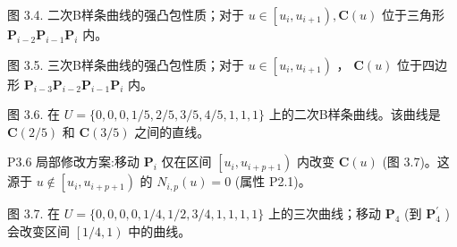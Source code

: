 \documentclass[../main.tex]{subfiles}
\begin{document}
\begin{center}
\begin{minipage}{16cm}
\vspace*{.6\baselineskip}
\centering
{}
\par\smallskip
图 3.4. 二次B样条曲线的强凸包性质；对于 \(u \in  \left\lbrack  {{u}_{i},{u}_{i + 1}}\right) ,\mathbf{C}\left( u\right)\) 位于三角形 \({\mathbf{P}}_{i - 2}{\mathbf{P}}_{i - 1}{\mathbf{P}}_{i}\) 内。
\end{minipage}
\end{center}

\begin{center}
\begin{minipage}{16cm}
\vspace*{.6\baselineskip}
\centering
{}
\par\smallskip
图 3.5. 三次B样条曲线的强凸包性质；对于 \(u \in  \left\lbrack  {{u}_{i},{u}_{i + 1}}\right)\) ， \(\mathbf{C}\left( u\right)\) 位于四边形 \({\mathbf{P}}_{i - 3}{\mathbf{P}}_{i - 2}{\mathbf{P}}_{i - 1}{\mathbf{P}}_{i}\) 内。
\end{minipage}
\end{center}

\begin{center}
\begin{minipage}{16cm}
\vspace*{.6\baselineskip}
\centering
{}
\par\smallskip
图 3.6. 在 \(U = \{ 0,0,0,1/5,2/5,3/5,4/5,1,1,1\}\) 上的二次B样条曲线。该曲线是 \(\mathbf{C}\left( {2/5}\right)\) 和 \(\mathbf{C}\left( {3/5}\right)\) 之间的直线。
\end{minipage}
\end{center}

P3.6 局部修改方案:移动 \({\mathbf{P}}_{i}\) 仅在区间 \(\left\lbrack  {{u}_{i},{u}_{i + p + 1}}\right)\) 内改变 \(\mathbf{C}\left( u\right)\) (图 3.7)。这源于 \(u \notin  \left\lbrack  {{u}_{i},{u}_{i + p + 1}}\right)\) 的 \({N}_{i,p}\left( u\right)  = 0\) (属性 P2.1)。

\begin{center}
\begin{minipage}{16cm}
\vspace*{.6\baselineskip}
\centering
{}
\par\smallskip
图 3.7. 在 \(U = \{ 0,0,0,0,1/4,1/2,3/4,1,1,1,1\}\) 上的三次曲线；移动 \({\mathbf{P}}_{4}\) (到 \({\mathbf{P}}_{4}^{\prime }\) )会改变区间 \(\left\lbrack  {1/4,1}\right)\) 中的曲线。
\end{minipage}
\end{center}
\end{document}

